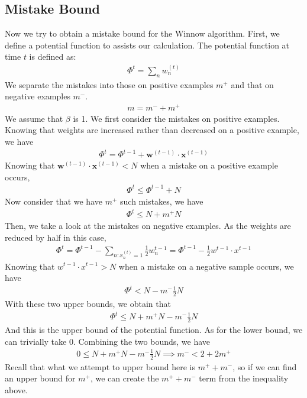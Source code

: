 \documentclass[11pt]{article}
\begin{document}
\subsection{Mistake Bound}
\vspace{-4mm}
Now we try to obtain a mistake bound for the Winnow algorithm. First, we define a potential function to assists our calculation. The potential function at time $t$ is defined as:
\begin{align}
    \Phi^t = \sum_n w_n^{(t)}
\end{align}
We separate the mistakes into those on positive examples $m^+$ and that on negative examples $m^-$.
\begin{align}
    m = m^- + m^+
\end{align}
We assume that $\beta$ is 1. We first consider the mistakes on positive examples. Knowing that weights are increased rather than decreased on a positive example, we have
\begin{align}
    \Phi^t = \Phi^{t-1} + \pmb{w}^{(t-1)} \cdot \pmb{x}^{(t-1)}
\end{align}
Knowing that $\pmb{w}^{(t-1)} \cdot \pmb{x}^{(t-1)} < N$ when a mistake on a positive example occurs,
\begin{align}
    \Phi^t \leq \Phi^{t-1} + N
\end{align}
Now consider that we have $m^+$ such mistakes, we have
\begin{align}
    \Phi^t \leq N + m^+ N
\end{align}
Then, we take a look at the mistakes on negative examples. As the weights are reduced by half in this case,
\begin{align}
    \Phi^t = \Phi^{t-1} - \sum_{n: x_n^{(t)} = 1} \frac{1}{2}w_n^{t-1} = \Phi^{t-1} - \frac{1}{2}w^{t-1} \cdot x^{t-1}
\end{align}
Knowing that $w^{t-1} \cdot x^{t-1} > N$ when a mistake on a negative sample occurs, we have
\begin{align}
    \Phi^t < N - m^- \frac{1}{2} N
\end{align}
With these two upper bounds, we obtain that
\begin{align}
    \Phi^t \leq N + m^+ N - m^- \frac{1}{2} N
\end{align}
And this is the upper bound of the potential function. As for the lower bound, we can trivially take 0. Combining the two bounds, we have
\begin{align}
    0 \leq N + m^+ N - m^- \frac{1}{2} N
    \implies m^- < 2 + 2m^+
\end{align}
Recall that what we attempt to upper bound here is $m^+ + m^-$, so if we can find an upper bound for $m^+$, we can create the $m^+ + m^-$ term from the inequality above.
\end{document}
